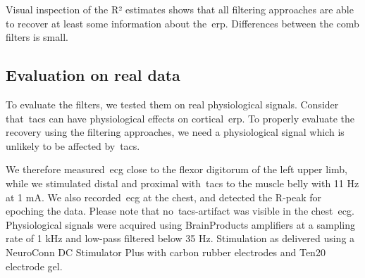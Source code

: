 \documentclass[a4paper]{article}
\begin{document}
Visual inspection of the R² estimates shows that all filtering approaches are able to recover at least some information about the~\gls{erp}. Differences between the comb filters is small.

\subsection{Evaluation on real data}\label{sec:EvaluationData}

To evaluate the filters, we tested them on real physiological signals. Consider that~\gls{tacs} can have physiological effects on cortical~\gls{erp}. To properly evaluate the recovery using the filtering approaches, we need a physiological signal which is unlikely to be affected by~\gls{tacs}.

We therefore measured~\gls{ecg} close to the flexor digitorum of the left upper limb, while we stimulated distal and proximal with~\gls{tacs} to the muscle belly with 11 Hz at 1 mA. We also recorded~\gls{ecg} at the chest, and detected the R-peak for epoching the data. Please note that no~\gls{tacs}-artifact was visible in the chest~\gls{ecg}.
Physiological signals were acquired using BrainProducts amplifiers at a sampling rate of 1 kHz and low-pass filtered below 35 Hz. Stimulation as delivered using a NeuroConn DC Stimulator Plus with carbon rubber electrodes and Ten20 electrode gel.
\end{document}

